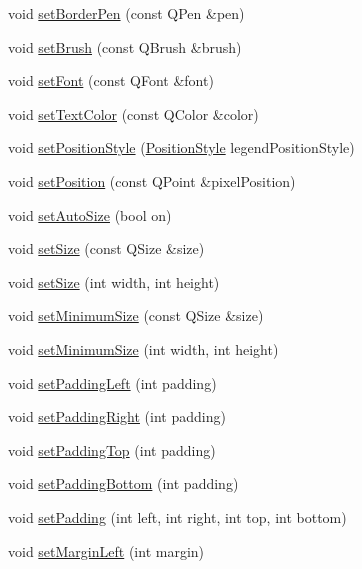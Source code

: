\begin{DoxyCompactItemize}
\item 
void \hyperlink{classQCPLegend_a866a9e3f5267de7430a6c7f26a61db9f}{set\-Border\-Pen} (const Q\-Pen \&pen)
\item 
void \hyperlink{classQCPLegend_a497bbcd38baa3598c08e2b3f48103f23}{set\-Brush} (const Q\-Brush \&brush)
\item 
void \hyperlink{classQCPLegend_aa4cda8499e3cb0f3be415edc02984c73}{set\-Font} (const Q\-Font \&font)
\item 
void \hyperlink{classQCPLegend_ae1eb239ff4a4632fe1b6c3e668d845c6}{set\-Text\-Color} (const Q\-Color \&color)
\item 
void \hyperlink{classQCPLegend_aecfd20e956460d1bdc65b79f48db533d}{set\-Position\-Style} (\hyperlink{classQCPLegend_aa61c3d82a6c7942dddefbf1ed1f7049f}{Position\-Style} legend\-Position\-Style)
\item 
void \hyperlink{classQCPLegend_a228788ae4caa5b5b269309bb32b54046}{set\-Position} (const Q\-Point \&pixel\-Position)
\item 
void \hyperlink{classQCPLegend_a067da0c0e2b0e9ee2c623f4d986c0d06}{set\-Auto\-Size} (bool on)
\item 
void \hyperlink{classQCPLegend_ae1d42dbf91b0046f7324dd07a16dd43f}{set\-Size} (const Q\-Size \&size)
\item 
void \hyperlink{classQCPLegend_a17d4fdebb8dd8a4b0afcd56555c78f6e}{set\-Size} (int width, int height)
\item 
void \hyperlink{classQCPLegend_a012c09cb070eabe01cfb598ab188a4fc}{set\-Minimum\-Size} (const Q\-Size \&size)
\item 
void \hyperlink{classQCPLegend_ae0e264950b0df9abd8e840e513df737b}{set\-Minimum\-Size} (int width, int height)
\item 
void \hyperlink{classQCPLegend_afde46ae0e759e58380bdb01df4aab1ce}{set\-Padding\-Left} (int padding)
\item 
void \hyperlink{classQCPLegend_a6d8b14e2f92130f8af1d66dd28691736}{set\-Padding\-Right} (int padding)
\item 
void \hyperlink{classQCPLegend_a6f8c6efe6a0a446ece7c1c44a7e31177}{set\-Padding\-Top} (int padding)
\item 
void \hyperlink{classQCPLegend_a396fa209cb63f6fa650951c291af8d0f}{set\-Padding\-Bottom} (int padding)
\item 
void \hyperlink{classQCPLegend_a6dec710ef473c79c96e92feb7528ae7d}{set\-Padding} (int left, int right, int top, int bottom)
\item 
void \hyperlink{classQCPLegend_ab4993084ae32855a5b1d8436b5f90721}{set\-Margin\-Left} (int margin)

\end{DoxyCompactItemize}
